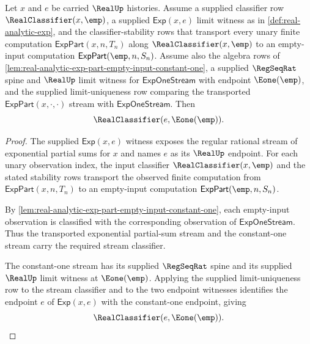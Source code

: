 \begin{theorem}
\label{thm:real-analytic-exp-empty-input-one}
Let $x$ and $e$ be carried $\RealUp$ histories. Assume a supplied classifier row $\RealClassifier(x,\emp)$, a supplied $\mathsf{Exp}(x,e)$ limit witness as in \autoref{def:real-analytic-exp}, and the classifier-stability rows that transport every unary finite computation $\mathsf{ExpPart}(x,n,T_n)$ along $\RealClassifier(x,\emp)$ to an empty-input computation $\mathsf{ExpPart}(\emp,n,S_n)$. Assume also the algebra rows of \autoref{lem:real-analytic-exp-part-empty-input-constant-one}, a supplied $\RegSeqRat$ spine and $\RealUp$ limit witness for $\mathsf{ExpOneStream}$ with endpoint $\Eone(\emp)$, and the supplied limit-uniqueness row comparing the transported $\mathsf{ExpPart}(x,\cdot,\cdot)$ stream with $\mathsf{ExpOneStream}$. Then
$$
\RealClassifier(e,\Eone(\emp)).
$$
\end{theorem}
\begin{proof}
The supplied $\mathsf{Exp}(x,e)$ witness exposes the regular rational stream of exponential partial sums for $x$ and names $e$ as its $\RealUp$ endpoint. For each unary observation index, the input classifier $\RealClassifier(x,\emp)$ and the stated stability rows transport the observed finite computation from $\mathsf{ExpPart}(x,n,T_n)$ to an empty-input computation $\mathsf{ExpPart}(\emp,n,S_n)$.

By \autoref{lem:real-analytic-exp-part-empty-input-constant-one}, each empty-input observation is classified with the corresponding observation of $\mathsf{ExpOneStream}$. Thus the transported exponential partial-sum stream and the constant-one stream carry the required stream classifier.

The constant-one stream has its supplied $\RegSeqRat$ spine and its supplied $\RealUp$ limit witness at $\Eone(\emp)$. Applying the supplied limit-uniqueness row to the stream classifier and to the two endpoint witnesses identifies the endpoint $e$ of $\mathsf{Exp}(x,e)$ with the constant-one endpoint, giving
$$
\RealClassifier(e,\Eone(\emp)).
$$
\end{proof}

